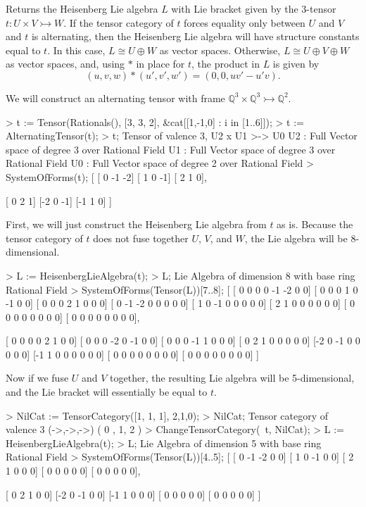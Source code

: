Returns the Heisenberg Lie algebra $L$ with Lie bracket given by the 3-tensor
$t:U\times V\rightarrowtail W$. If the tensor category of $t$ forces equality
only between $U$ and $V$ and $t$ is alternating, then the Heisenberg Lie algebra
will have structure constants equal to $t$. In this case, $L\cong U\oplus W$ as
vector spaces. Otherwise, $L\cong U\oplus V\oplus W$ as vector spaces, and,
using $*$ in place for $t$, the product in $L$ is given by
\[ (u,v,w) * (u',v',w') = (0,0,uv'-u'v). \]

\begin{example}[CraftingLieAlgberas]

We will construct an alternating tensor with frame $\mathbb{Q}^3\times\mathbb{Q}^3\rightarrowtail \mathbb{Q}^2$. 
\begin{code}
> t := Tensor(Rationals(), [3, 3, 2], &cat[[1,-1,0] : i in [1..6]]);
> t := AlternatingTensor(t);
> t;
Tensor of valence 3, U2 x U1 >-> U0
U2 : Full Vector space of degree 3 over Rational Field
U1 : Full Vector space of degree 3 over Rational Field
U0 : Full Vector space of degree 2 over Rational Field
> SystemOfForms(t);
[
    [ 0 -1 -2]
    [ 1  0 -1]
    [ 2  1  0],

    [ 0  2  1]
    [-2  0 -1]
    [-1  1  0]
]
\end{code}

First, we will just construct the Heisenberg Lie algebra from $t$ as is. Because
the tensor category of $t$ does not fuse together $U$, $V$, and $W$, the Lie
algebra will be 8-dimensional.
\begin{code}
> L := HeisenbergLieAlgebra(t);
> L;
Lie Algebra of dimension 8 with base ring Rational Field
> SystemOfForms(Tensor(L))[7..8];
[
    [ 0  0  0  0 -1 -2  0  0]
    [ 0  0  0  1  0 -1  0  0]
    [ 0  0  0  2  1  0  0  0]
    [ 0 -1 -2  0  0  0  0  0]
    [ 1  0 -1  0  0  0  0  0]
    [ 2  1  0  0  0  0  0  0]
    [ 0  0  0  0  0  0  0  0]
    [ 0  0  0  0  0  0  0  0],

    [ 0  0  0  0  2  1  0  0]
    [ 0  0  0 -2  0 -1  0  0]
    [ 0  0  0 -1  1  0  0  0]
    [ 0  2  1  0  0  0  0  0]
    [-2  0 -1  0  0  0  0  0]
    [-1  1  0  0  0  0  0  0]
    [ 0  0  0  0  0  0  0  0]
    [ 0  0  0  0  0  0  0  0]
]
\end{code}

Now if we fuse $U$ and $V$ together, the resulting Lie algebra will be
5-dimensional, and the Lie bracket will essentially be equal to $t$.
\begin{code}
> NilCat := TensorCategory([1, 1, 1], {{2,1},{0}});
> NilCat;
Tensor category of valence 3 (->,->,->) ({ 0 },{ 1, 2 })
> ChangeTensorCategory(~t, NilCat);
> L := HeisenbergLieAlgebra(t);
> L;
Lie Algebra of dimension 5 with base ring Rational Field
> SystemOfForms(Tensor(L))[4..5];
[
    [ 0 -1 -2  0  0]
    [ 1  0 -1  0  0]
    [ 2  1  0  0  0]
    [ 0  0  0  0  0]
    [ 0  0  0  0  0],

    [ 0  2  1  0  0]
    [-2  0 -1  0  0]
    [-1  1  0  0  0]
    [ 0  0  0  0  0]
    [ 0  0  0  0  0]
]
\end{code}
\end{example}

